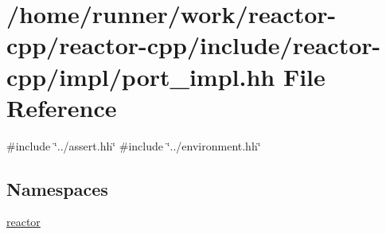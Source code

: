 \hypertarget{port__impl_8hh}{}\section{/home/runner/work/reactor-\/cpp/reactor-\/cpp/include/reactor-\/cpp/impl/port\+\_\+impl.hh File Reference}
\label{port__impl_8hh}
{\ttfamily \#include \char`\"{}../assert.\+hh\char`\"{}}\newline
{\ttfamily \#include \char`\"{}../environment.\+hh\char`\"{}}\newline
\subsection*{Namespaces}
\begin{DoxyCompactItemize}
\item 
 \hyperlink{namespacereactor}{reactor}
\end{DoxyCompactItemize}

